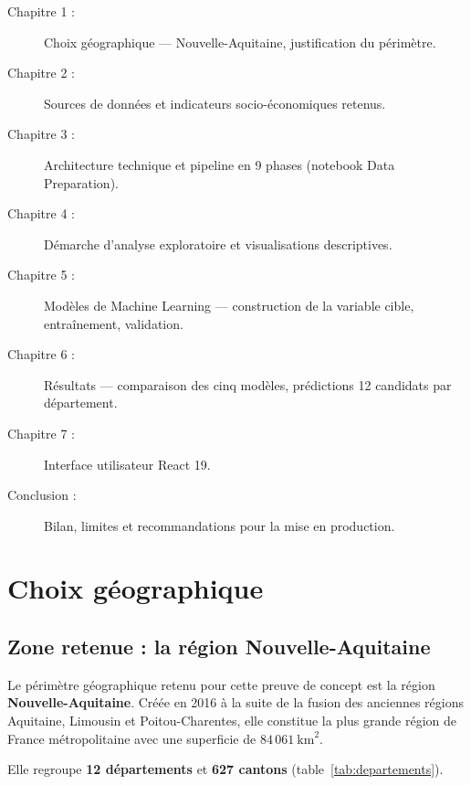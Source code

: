 \documentclass[12pt,a4paper,oneside]{report}
\begin{document}
\begin{description}
  \item[Chapitre 1 :] Choix géographique — Nouvelle-Aquitaine, justification du périmètre.
  \item[Chapitre 2 :] Sources de données et indicateurs socio-économiques retenus.
  \item[Chapitre 3 :] Architecture technique et pipeline en 9 phases (notebook Data Preparation).
  \item[Chapitre 4 :] Démarche d'analyse exploratoire et visualisations descriptives.
  \item[Chapitre 5 :] Modèles de Machine Learning — construction de la variable cible, entraînement, validation.
  \item[Chapitre 6 :] Résultats — comparaison des cinq modèles, prédictions 12 candidats par département.
  \item[Chapitre 7 :] Interface utilisateur React 19.
  \item[Conclusion :] Bilan, limites et recommandations pour la mise en production.
\end{description}

\chapter{Choix géographique}

\section{Zone retenue : la région Nouvelle-Aquitaine}

Le périmètre géographique retenu pour cette preuve de concept est la région \textbf{Nouvelle-Aquitaine}. Créée en 2016 à la suite de la fusion des anciennes régions Aquitaine, Limousin et Poitou-Charentes, elle constitue la plus grande région de France métropolitaine avec une superficie de $84\,061\ \text{km}^{2}$.

Elle regroupe \textbf{12 départements} et \textbf{627 cantons} (table~\ref{tab:departements}).
\end{document}
